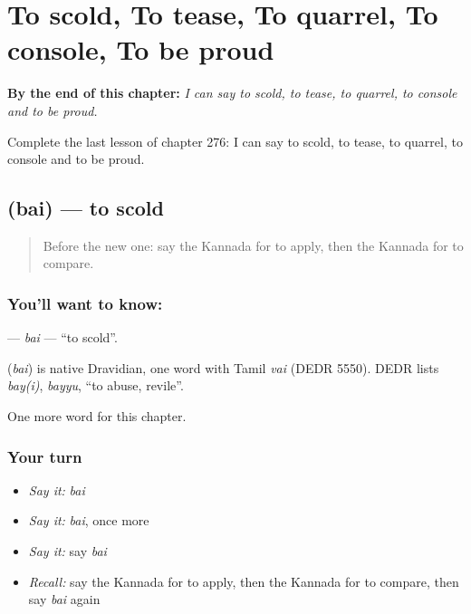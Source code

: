 
\chapter{To scold, To tease, To quarrel, To console, To be proud}
\label{ch:ka-to-scold-to-tease-to-quarrel-to-console-to-be-proud}

\begin{chapteropening}
\textbf{By the end of this chapter:} \emph{I can say to scold, to tease, to quarrel, to console and to be proud.}

Complete the last lesson of chapter 276: I can say to scold, to tease, to quarrel, to console and to be proud.
\end{chapteropening}

\section[\texorpdfstring{\kn{ಬೈ} (bai)}{ಬೈ (bai)}]{ (bai) — to scold}

\label{lesson:KA-C276-bai}



\begin{quote}
Before the new one: say the Kannada for to apply, then the Kannada for to compare.
\end{quote}

\subsection*{You'll want to know: }
\textbf{} — \emph{bai} — \textquotedblleft{}to scold\textquotedblright{}.

\begin{cousinweb}
\textbf{} (\emph{bai}) is native Dravidian, one word with Tamil \emph{vai} (DEDR 5550). DEDR lists \emph{bay(i)}, \emph{bayyu}, \textquotedblleft{}to abuse, revile\textquotedblright{}.
\end{cousinweb}

\begin{grammarlens}[title={What you've built}]
One more word for this chapter.
\end{grammarlens}

\subsection*{Your turn}
\begin{itemize}
\raggedright
  \item \emph{Say it:} \emph{bai}
  \item \emph{Say it:} \emph{bai}, once more
  \item \emph{Say it:} say \emph{bai}
  \item \emph{Recall:} say the Kannada for to apply, then the Kannada for to compare, then say \emph{bai} again
\end{itemize}


